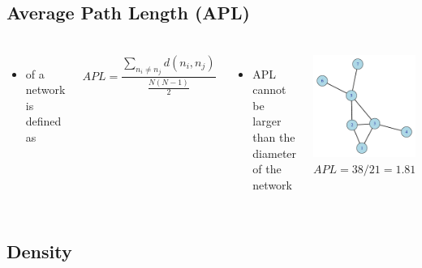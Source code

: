 \documentclass[8pt]{beamer}
\begin{document}
\subsection{Average Path Length (APL)}

\begin{frame}
\frametitle{\insertsection}
\framesubtitle{\insertsubsection}

\begin{columns}
\begin{itemize}
\item {\color{blue}{Average Path Length (APL)}} of a network is defined as
\end{itemize}

\begin{equation*}
APL = \frac{\sum_{n_i\neq n_j}d(n_i,n_j)}{\frac{N(N-1)}{2}}
\end{equation*}

\begin{itemize}
\item APL cannot be larger than the diameter of the network
\end{itemize}

\centering
\includegraphics[width=5cm]{base}\\
        $APL = 38/21 = 1.81$
\end{columns}

\end{frame}

\subsection{Density}
\end{document}
